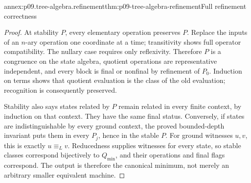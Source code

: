 \begin{annexitem}{annex:p09.tree-algebra.refinement}{thm:p09-tree-algebra-refinement}{Full refinement correctness}
\begin{proof}
At stability \(P\), every elementary operation preserves \(P\).
Replace the inputs of an \(n\)-ary operation one coordinate at a
time; transitivity shows full operator compatibility. The nullary
case requires only reflexivity. Therefore \(P\) is a congruence
on the state algebra, quotient operations are representative independent,
and every block is final or nonfinal by refinement of \(P_0\).
Induction on terms shows that quotient evaluation is the class of the
old evaluation; recognition is consequently preserved.

Stability also says states related by \(P\) remain related in every
finite context, by induction on that context. They have the same
final status. Conversely, if states are indistinguishable by every
ground context, the proved bounded-depth invariant puts them in every
\(P_j\), hence in the stable \(P\).
For ground witnesses \(u,v\), this is exactly \(u\equiv_L v\).
Reducedness supplies witnesses for every state, so stable classes
correspond bijectively to \(Q_{\min}\), and their operations and
final flags correspond. The output is therefore the canonical minimum,
not merely an arbitrary smaller equivalent machine.
\end{proof}
\end{annexitem}

